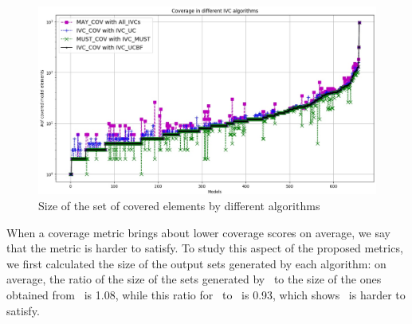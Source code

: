 \begin{figure}
  \centering
  \includegraphics[width=\columnwidth]{figs/cv_size.jpg}
  \caption{Size of the set of covered elements by different algorithms}\label{fig:cvsize}
\end{figure}

When a coverage metric brings about lower coverage scores on average,
we say that the metric is harder to satisfy. To study this aspect of the proposed metrics, we first calculated the size of the output sets generated by each algorithm: on average, the ratio of the size of the sets generated by \ucalg\ to the size of the ones obtained from \ucbfalg\ is 1.08,
while this ratio for \mustalg\ to \ucbfalg\ is 0.93, which shows \mustalg\ is harder to satisfy.

